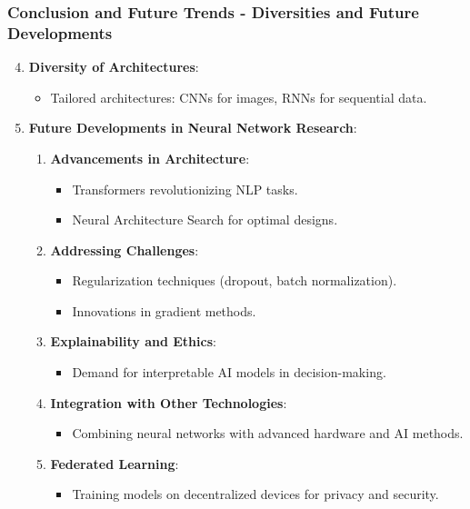 \documentclass{beamer}
\begin{document}
\begin{frame}[fragile]
    \frametitle{Conclusion and Future Trends - Diversities and Future Developments}
    \begin{enumerate}
        \setcounter{enumi}{3}
        \item \textbf{Diversity of Architectures}:
        \begin{itemize}
            \item Tailored architectures: CNNs for images, RNNs for sequential data.
        \end{itemize}
        
        \item \textbf{Future Developments in Neural Network Research}:
        \begin{enumerate}
            \item \textbf{Advancements in Architecture}:
            \begin{itemize}
                \item Transformers revolutionizing NLP tasks.
                \item Neural Architecture Search for optimal designs.
            \end{itemize}

            \item \textbf{Addressing Challenges}:
            \begin{itemize}
                \item Regularization techniques (dropout, batch normalization).
                \item Innovations in gradient methods.
            \end{itemize}

            \item \textbf{Explainability and Ethics}:
            \begin{itemize}
                \item Demand for interpretable AI models in decision-making.
            \end{itemize}

            \item \textbf{Integration with Other Technologies}:
            \begin{itemize}
                \item Combining neural networks with advanced hardware and AI methods.
            \end{itemize}

            \item \textbf{Federated Learning}:
            \begin{itemize}
                \item Training models on decentralized devices for privacy and security.
            \end{itemize}
        \end{enumerate}
    \end{enumerate}
\end{frame}
\end{document}

